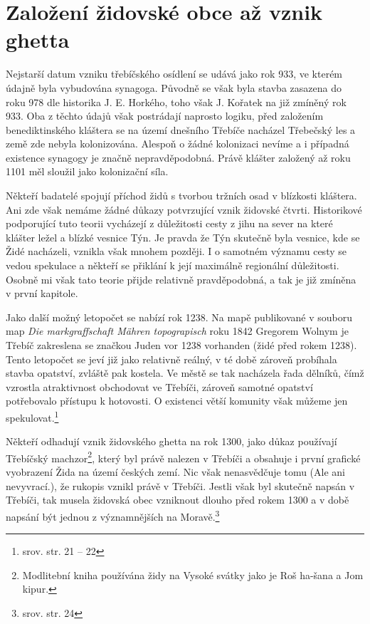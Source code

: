 \documentclass[a4paper,oneside,12pt]{report}
\begin{document}
\section{Založení židovské obce až vznik ghetta}

Nejstarší datum vzniku třebíčského osídlení se udává jako rok 933, ve kterém údajně byla vybudována synagoga.
Původně se však byla stavba zasazena do roku 978 dle historika J. E. Horkého, toho však J. Kořatek  na již zmíněný rok 933.
Oba z těchto údajů však postrádají naprosto logiku, před založením benediktinského kláštera se na území dnešního Třebíče nacházel Třebečský les a země zde nebyla kolonizována.
Alespoň o žádné kolonizaci nevíme a i případná existence synagogy je značně nepravděpodobná.
Právě klášter založený až roku 1101 měl sloužil jako kolonizační síla.

Někteří badatelé spojují příchod židů s tvorbou tržních osad v blízkosti kláštera.
Ani zde však nemáme žádné důkazy potvrzující vznik židovské čtvrti.
Historikové podporující tuto teorii vycházejí z důležitosti cesty z jihu na sever na které klášter ležel a blízké vesnice Týn.
Je pravda že Týn skutečně byla vesnice, kde se Židé nacházeli, vznikla však mnohem později.
I o samotném významu cesty se vedou spekulace a někteří se přiklání k její maximálně regionální důležitosti.
Osobně mi však tato teorie přijde relativně pravděpodobná, a tak je již zmíněna v první kapitole.

Jako další možný letopočet se nabízí rok 1238.
Na mapě publikované v souboru map \textit{Die markgraffschaft Mähren topograpisch} roku 1842 Gregorem Wolnym je Třebíč zakreslena se značkou Juden vor 1238 vorhanden (židé před rokem 1238).
Tento letopočet se jeví již jako relativně reálný, v té době zároveň probíhala stavba opatství, zvláště pak kostela.
Ve městě se tak nacházela řada dělníků, čímž vzrostla atraktivnost obchodovat ve Třebíči, zároveň samotné opatství potřebovalo přístupu k hotovosti.
O existenci větší komunity však můžeme jen spekulovat.\footnote{srov. \cite{Fiser2005} str. 21 -- 22}

Někteří odhadují vznik židovského ghetta na rok 1300, jako důkaz používají Třebíčský machzor\footnote{Modlitební kniha používána židy na Vysoké svátky jako je Roš ha-šana a Jom kipur.}, který byl právě nalezen v Třebíči a obsahuje i první grafické vyobrazení Žida na území českých zemí.
Nic však nenasvědčuje tomu (Ale ani nevyvrací.), že rukopis vznikl právě v Třebíči.
Jestli však byl skutečně napsán v Třebíči, tak musela židovská obec vzniknout dlouho před rokem 1300 a v době napsání být jednou z významnějších na Moravě.\footnote{srov.  str. 24}
\end{document}
